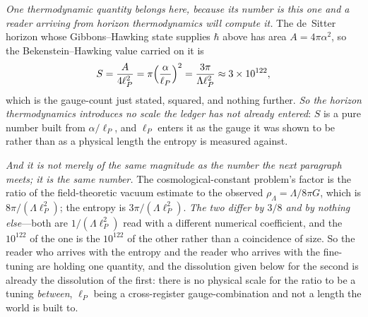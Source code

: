 \documentclass[11pt,a4paper]{article}
\theoremstyle{definition}
\begin{document}
\emph{One thermodynamic quantity belongs here, because its number is this
one and a reader arriving from horizon thermodynamics will compute it.} The de~Sitter horizon whose
Gibbons--Hawking state supplies $\hbar$ above has area $A=4\pi\alpha^{2}$, so the Bekenstein--Hawking
value carried on it is
\begin{equation}\label{eq:ds-entropy}
S=\frac{A}{4\ell_P^{2}}=\pi\Bigl(\frac{\alpha}{\ell_P}\Bigr)^{2}=\frac{3\pi}{\Lambda\ell_P^{2}}
\approx3\times10^{122},
\end{equation}
which is the gauge-count just stated, squared, and nothing further.
\emph{So the horizon thermodynamics introduces no scale the ledger has not already entered}: $S$ is a
pure number built from $\alpha/\ell_P$, and $\ell_P$ enters it as the gauge it was shown to be rather
than as a physical length the entropy is measured against.

\emph{And it is not merely of the same magnitude as the number the next paragraph meets; it is the same
number.} The cosmological-constant problem's factor is the ratio of the field-theoretic vacuum estimate
to the observed $\rho_\Lambda=\Lambda/8\pi G$, which is $8\pi/(\Lambda\ell_P^{2})$; the entropy is
$3\pi/(\Lambda\ell_P^{2})$. \emph{The two differ by $3/8$ and by nothing else}---both are
$1/(\Lambda\ell_P^{2})$ read with a different numerical coefficient, and the $10^{122}$ of the one is
the $10^{122}$ of the other rather than a coincidence of size. So the reader who arrives with the
entropy and the reader who arrives with the fine-tuning are holding one quantity, and the dissolution
given below for the second is already the dissolution of the first: there is no physical scale for the
ratio to be a tuning \emph{between}, $\ell_P$ being a cross-register gauge-combination and not a
length the world is built to.
\end{document}
